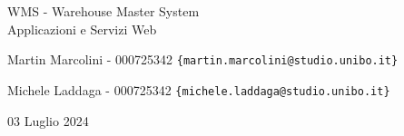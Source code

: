 \begin{titlepage}
    \begin{center}
        \vspace*{3cm}
        {\LARGE WMS - Warehouse Master System}\\
        Applicazioni e Servizi Web
        \vspace{10mm} \par
        {Martin Marcolini - 000725342}
        \texttt{{\{martin.marcolini@studio.unibo.it\}}}
        \vspace{5mm} \par
        {Michele Laddaga - 000725342}
        \texttt{{\{michele.laddaga@studio.unibo.it\}}}
        \vspace{10mm} \par
        03 Luglio 2024
    \end{center}

\end{titlepage}
